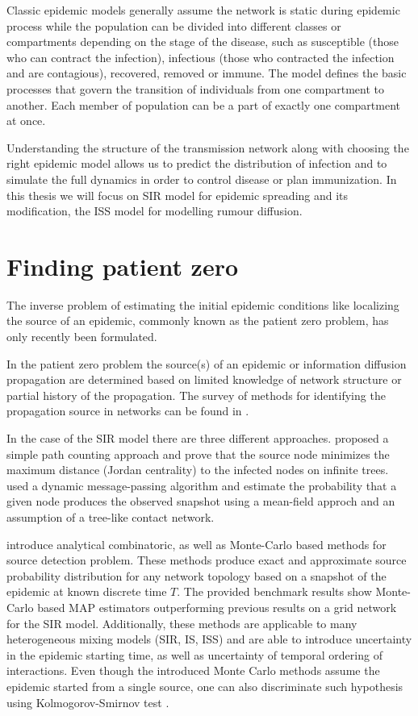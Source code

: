 \documentclass[times, utf8, diplomski]{fer}
\begin{document}
 Classic epidemic models generally  assume the network is static during epidemic process while the population can be divided into different classes or compartments depending on the stage of the disease, such as susceptible (those who can contract the infection), infectious (those who contracted the infection and are contagious), recovered,  removed or immune. The model defines the basic processes that govern the transition of individuals from one compartment to another.
 Each member of population can be a part of exactly one compartment at once. 
 
 Understanding the structure of the transmission network along with choosing the right epidemic model allows us to predict the distribution of infection and to simulate the full dynamics in order to control disease or plan immunization. In this thesis we will focus on SIR model for epidemic spreading and its modification, the ISS model for modelling rumour diffusion. 

\section{Finding patient zero}  
The inverse problem of estimating the initial epidemic conditions like localizing the source of an epidemic, commonly known as the patient zero problem, has only recently been formulated.

In the patient zero problem the source(s) of an epidemic or information diffusion propagation are determined based on limited knowledge of network structure or partial history of the propagation. The survey of methods for identifying the propagation source in networks can be found in \citet{soa_source}.

In the case of the SIR model there are three different approaches. \citet{Zhu} proposed a simple path counting approach and prove that the source node minimizes the maximum distance (Jordan centrality) to the infected nodes on infinite trees. \citet{Lohkov} used a dynamic message-passing algorithm and estimate the probability that a given node produces the observed snapshot using a mean-field approch and an assumption of a tree-like contact network.

\citet{Nino} introduce analytical combinatoric, as well as Monte-Carlo based methods for source detection problem. These methods produce exact and approximate source probability distribution for any network topology based on a snapshot of the epidemic at known discrete time $T$. The provided benchmark results show Monte-Carlo based MAP estimators outperforming previous results on a grid network for the SIR model. Additionally, these methods are applicable to many heterogeneous mixing models (SIR, IS, ISS) and are able to introduce uncertainty in the epidemic starting time, as well as uncertainty of temporal ordering of interactions. 
Even though the introduced Monte Carlo methods assume the epidemic started from a single source, one can also discriminate such hypothesis using Kolmogorov-Smirnov test \cite{Nino}.
\end{document}
